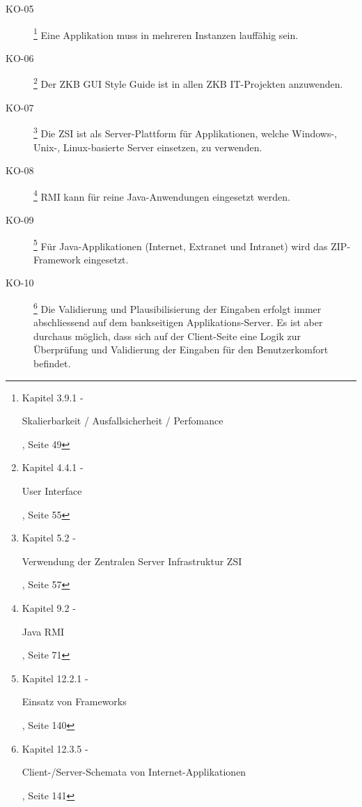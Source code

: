 \begin{description}
    \item[KO-05\label{itm:KO-05}]
    \footnote{\cite{ZkbHandbuchDerItArchitektur} Kapitel 3.9.1 -
    \begin{itshape}Skalierbarkeit / Ausfallsicherheit / Perfomance\end{itshape},
    Seite 49}
    Eine Applikation muss in mehreren Instanzen lauffähig sein.

    \item[KO-06\label{itm:KO-06}]
    \footnote{\cite{ZkbHandbuchDerItArchitektur} Kapitel 4.4.1 -
    \begin{itshape}User Interface\end{itshape}, Seite 55}
    Der ZKB GUI Style Guide ist in allen ZKB IT-Projekten anzuwenden.
    
    \item[KO-07\label{itm:KO-07}]
    \footnote{\cite{ZkbHandbuchDerItArchitektur} Kapitel 5.2 -
    \begin{itshape}Verwendung der Zentralen Server Infrastruktur
    ZSI\end{itshape}, Seite 57}
    Die \ac{ZSI} ist als Server-Plattform für Applikationen, welche Windows-,
    Unix-, Linux-basierte Server einsetzen, zu verwenden.
    
    \item[KO-08\label{itm:KO-08}]
    \footnote{\cite{ZkbHandbuchDerItArchitektur} Kapitel 9.2 -
    \begin{itshape}Java RMI\end{itshape}, Seite 71}
    RMI kann für reine Java-Anwendungen eingesetzt werden.
    
    \item[KO-09\label{itm:KO-09}]
    \footnote{\cite{ZkbHandbuchDerItArchitektur} Kapitel 12.2.1 -
    \begin{itshape}Einsatz von Frameworks\end{itshape}, Seite 140}
    Für Java-Applikationen (Internet, Extranet und Intranet) wird das
    ZIP-Framework eingesetzt.
    
    \item[KO-10\label{itm:KO-10}]
    \footnote{\cite{ZkbHandbuchDerItArchitektur} Kapitel 12.3.5 -
    \begin{itshape}Client-/Server-Schemata von Internet-Applikationen\end{itshape}, Seite 141}
    Die Validierung und Plausibilisierung der Eingaben erfolgt immer
    abschliessend auf dem bankseitigen Applikations-Server. Es ist aber
    durchaus möglich, dass sich auf der Client-Seite eine Logik zur Überprüfung
    und Validierung der Eingaben für den Benutzerkomfort befindet.
    

\end{description}
